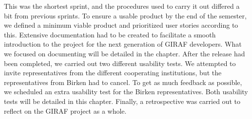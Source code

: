 This was the shortest sprint, and the procedures used to carry it out differed a bit from previous sprints.
To ensure a usable product by the end of the semester, we defined a minimum viable product and prioritized user stories according to this.
Extensive documentation had to be created to facilitate a smooth introduction to the project for the next generation of GIRAF developers.
What we focused on documenting will be detailed in the chapter. 
After the release had been completed, we carried out two different usability tests.
We attempted to invite representatives from the different cooperating institutions, but the representatives from Birken had to cancel.
To get as much feedback as possible, we scheduled an extra usability test for the Birken representatives.
Both usability tests will be detailed in this chapter. 
Finally, a retrospective was carried out to reflect on the GIRAF project as a whole.
